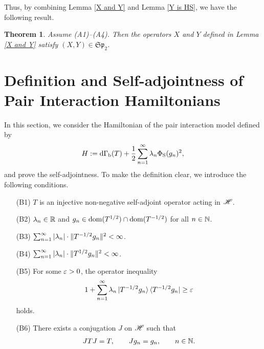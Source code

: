 \documentclass[12pt]{article}
\theoremstyle{plain}
\newtheorem{thm}[theorem]{\bf Theorem}
\numberwithin{equation}{section}
\theoremstyle{remark}
\begin{document}
Thus, by combining Lemma \ref{X and Y} and Lemma \ref{Y is HS}, we have the following result.
\begin{thm}\label{SP2}
  Assume (A1)--(A4). Then the operators $X$ and $Y$ defined in Lemma \ref{X and Y} satisfy
$(X,Y)\in\mathfrak{Sp}_2$.
\end{thm}






\section{Definition and Self-adjointness of Pair Interaction Hamiltonians}\label{DefModel}
In this section, we consider the Hamiltonian of the pair interaction model defined by
\begin{align}
  H := \mathrm{d\Gamma_b}(T) + \frac{1}{2} \sum_{n=1}^\infty \lambda_n \Phi_\mathrm{S}(g_n)^2, \label{hamil}
\end{align}
and prove the self-adjointness.
To make the definition clear, we introduce the following conditions.
\begin{enumerate}
\item[(B1)] $T$ is an injective non-negative self-adjoint operator acting in $\mathscr{H}$.
\item[(B2)] $\lambda_n\in\mathbb{R}$ and $g_n\in\mathop{\mathrm{dom}}(T^{1/2})\cap\mathop{\mathrm{dom}}(T^{-1/2})$ for all $n\in\mathbb{N}$.
\item[(B3)] $\sum_{n=1}^\infty |\lambda_n| \cdot\| T^{-1/2}g_n \|^2<\infty$.
\item[(B4)] $\sum_{n=1}^\infty |\lambda_n| \cdot\| T^{1/2}g_n \|^2<\infty$.
\item[(B5)] For some $\varepsilon>0$, the operator inequality
  \begin{equation}\label{B5}
    1 + \sum_{n=1}^\infty \lambda_n \ket{T^{-1/2}g_n} \bra{T^{-1/2}g_n} \geq \varepsilon
  \end{equation}
holds.
\item[(B6)] There exists a conjugation $J$ on $\mathscr{H}$ such that 
  \begin{align*}
    JTJ = T, \qquad Jg_n = g_n, \qquad n\in\mathbb{N}.
  \end{align*}
\end{enumerate}
\end{document}
